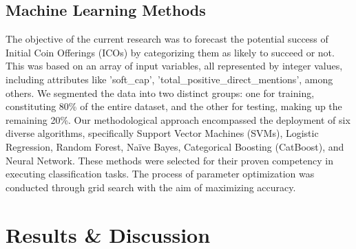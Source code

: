 \documentclass[runningheads]{llncs}
\begin{document}
\subsection{Machine Learning Methods}

The objective of the current research was to forecast the potential success of Initial Coin Offerings (ICOs) by categorizing them as likely to succeed or not. This was based on an array of input variables, all represented by integer values, including attributes like 'soft\_cap', 'total\_positive\_direct\_mentions', among others. We segmented the data into two distinct groups: one for training, constituting 80\% of the entire dataset, and the other for testing, making up the remaining 20\%. Our methodological approach encompassed the deployment of six diverse algorithms, specifically Support Vector Machines (SVMs), Logistic Regression, Random Forest, Naïve Bayes, Categorical Boosting (CatBoost), and Neural Network. These methods were selected for their proven competency in executing classification tasks. The process of parameter optimization was conducted through grid search with the aim of maximizing accuracy.




\section{Results \& Discussion}
\end{document}

